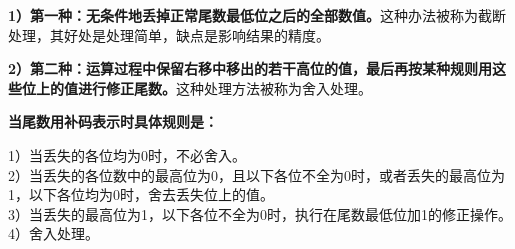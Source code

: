\textbf{1）第一种：无条件地丢掉正常尾数最低位之后的全部数值。}这种办法被称为截断处理，其好处是处理简单，缺点是影响结果的精度。
~

\textbf{2）第二种：运算过程中保留右移中移出的若干高位的值，最后再按某种规则用这些位上的值进行修正尾数。}这种处理方法被称为舍入处理。

{\textbf{当尾数用补码表示时}}{\textbf{具体规则是：}}

1）当丢失的各位均为0时，不必舍入。\\
2）当丢失的各位数中的最高位为0，且以下各位不全为0时，或者丢失的最高位为1，以下各位均为0时，舍去丢失位上的值。\\
3）当丢失的最高位为1，以下各位不全为0时，执行在尾数最低位加1的修正操作。\\
4）舍入处理。\\
